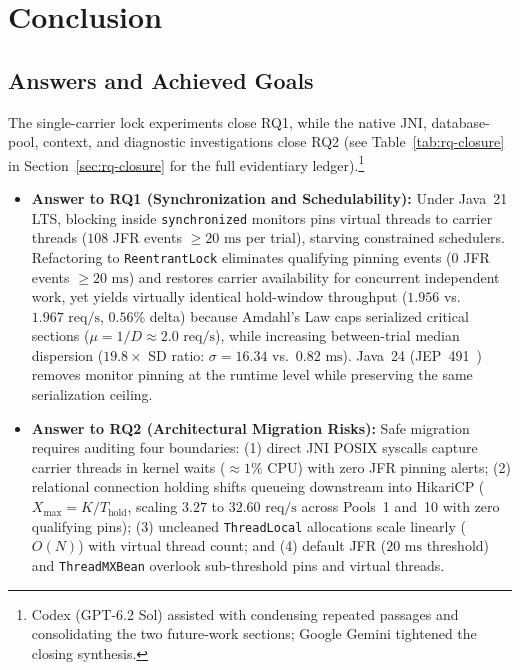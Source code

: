 \chapter{Conclusion}
\label{ch:conclusion}

\section{Answers and Achieved Goals}
\label{sec:conclusion-answers}

The single-carrier lock experiments close RQ1, while the native JNI, database-pool, context, and diagnostic investigations close RQ2 (see Table~\ref{tab:rq-closure} in Section~\ref{sec:rq-closure} for the full evidentiary ledger).\footnote{Codex (GPT-6.2 Sol) assisted with condensing repeated passages and consolidating the two future-work sections; Google Gemini tightened the closing synthesis.}
\begin{itemize}
  \item \textbf{Answer to RQ1 (Synchronization and Schedulability):} Under Java~21 LTS, blocking inside \texttt{synchronized} monitors pins virtual threads to carrier threads ($108$ JFR events $\ge 20\text{ ms}$ per trial), starving constrained schedulers. Refactoring to \texttt{ReentrantLock} eliminates qualifying pinning events ($0$ JFR events $\ge 20\text{ ms}$) and restores carrier availability for concurrent independent work, yet yields virtually identical hold-window throughput ($1.956$ vs.\ $1.967\text{ req/s}$, $0.56\%$ delta) because Amdahl's Law caps serialized critical sections ($\mu = 1/D \approx 2.0\text{ req/s}$), while increasing between-trial median dispersion ($19.8\times$ SD ratio: $\sigma = 16.34$ vs.\ $0.82\text{ ms}$). Java~24 (JEP~491~\cite{JEP491}) removes monitor pinning at the runtime level while preserving the same serialization ceiling.
  \item \textbf{Answer to RQ2 (Architectural Migration Risks):} Safe migration requires auditing four boundaries: (1) direct JNI POSIX syscalls capture carrier threads in kernel waits ($\approx 1\%$ CPU) with zero JFR pinning alerts; (2) relational connection holding shifts queueing downstream into HikariCP ($X_{\text{max}} = K/T_{\text{hold}}$, scaling $3.27$ to $32.60\text{ req/s}$ across Pools~1 and~10 with zero qualifying pins); (3) uncleaned \texttt{ThreadLocal} allocations scale linearly ($O(N)$) with virtual thread count; and (4) default JFR ($20\text{ ms}$ threshold) and \texttt{ThreadMXBean} overlook sub-threshold pins and virtual threads.
\end{itemize}

